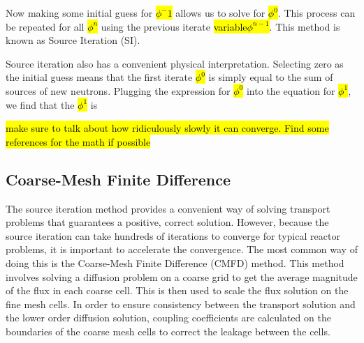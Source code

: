 {Now making some initial guess for \hl{$\phi^-1$} allows us to solve for \hl{$\phi^0$}.  This process can be repeated for all \hl{$\phi^n$} using the previous iterate \hl{variable$\phi^{n-1}$}.  This method is known as Source Iteration (SI).

Source iteration also has a convenient physical interpretation.  Selecting zero as the initial guess means that the first iterate \hl{$\phi^0$} is simply equal to the sum of sources of new neutrons.  Plugging the expression for \hl{$\phi^0$} into the equation for \hl{$\phi^1$}, we find that the \hl{$\phi^1$} is 

\hl{make sure to talk about how ridiculously slowly it can converge.  Find some references for the math if possible}}{}

\subsection{Coarse-Mesh Finite Difference}\label{ss:CMFD}

The source iteration method provides a convenient way of solving transport problems that guarantees a positive, correct solution.  However, because the source iteration can take hundreds of iterations to converge for typical reactor problems, it is important to accelerate the convergence.  The most common way of doing this is the Coarse-Mesh Finite Difference (CMFD) method.  This method involves solving a diffusion problem on a coarse grid to get the average magnitude of the flux in each coarse cell.  This is then used to scale the flux solution on the fine mesh cells.  In order to ensure consistency between the transport solution and the lower order diffusion solution, coupling coefficients are calculated on the boundaries of the coarse mesh cells to correct the leakage between the cells.

